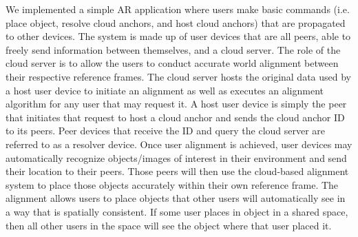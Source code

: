 \documentclass{vgtc}                          %
\begin{document}
We implemented a simple AR application where users make basic commands (i.e. place object, resolve cloud anchors, and host cloud anchors) 
that are propagated to other devices. The system is made up of user devices that are all peers, able to freely send
information between themselves, and a cloud server. The role of the cloud server is to allow the users to conduct accurate world alignment between 
their respective reference frames. The cloud server hosts the original data used by a host user device to initiate an alignment as well as executes 
an alignment algorithm for any user that may request it. A host user device is simply the peer that initiates that request to host a cloud anchor 
and sends the  cloud anchor ID to its peers. Peer devices that receive the ID and query the cloud server are referred to as a resolver device. Once 
user alignment is achieved, user devices may automatically recognize objects/images of interest in their environment and send their location to their peers. 
Those peers will then use the cloud-based alignment system to place those objects accurately within their own reference frame. The alignment allows users to 
place objects that other users will automatically see in a way that is spatially consistent. If some user places in object in a shared 
space, then all other users in the space will see the object where that user placed it. 

\end{document}
